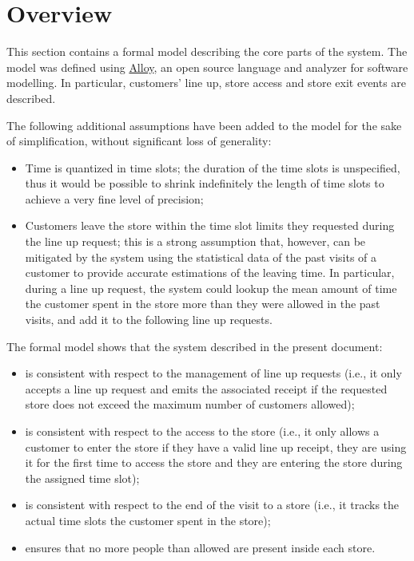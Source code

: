 \documentclass[../../main.tex]{subfiles}
\begin{document}
\section{Overview}

This section contains a formal model describing the core parts of the system. The model was defined using \href{https://alloytools.org/}{Alloy}, an open source language and analyzer for software modelling. In particular, customers' line up, store access and store exit events are described.

The following additional assumptions have been added to the model for the sake of simplification, without significant loss of generality:
\begin{itemize}
  \item Time is quantized in time slots; the duration of the time slots is unspecified, thus it would be possible to shrink indefinitely the length of time slots to achieve a very fine level of precision;
  \item Customers leave the store within the time slot limits they requested during the line up request; this is a strong assumption that, however, can be mitigated by the system using the statistical data of the past visits of a customer to provide accurate estimations of the leaving time. In particular, during a line up request, the system could lookup the mean amount of time the customer spent in the store more than they were allowed in the past visits, and add it to the following line up requests.
\end{itemize}

The formal model shows that the system described in the present document:
\begin{itemize}
  \item is consistent with respect to the management of line up requests (i.e., it only accepts a line up request and emits the associated receipt if the requested store does not exceed the maximum number of customers allowed);
  \item is consistent with respect to the access to the store (i.e., it only allows a customer to enter the store if they have a valid line up receipt, they are using it for the first time to access the store and they are entering the store during the assigned time slot);
  \item is consistent with respect to the end of the visit to a store (i.e., it tracks the actual time slots the customer spent in the store);
  \item ensures that no more people than allowed are present inside each store.
\end{itemize}
\end{document}
